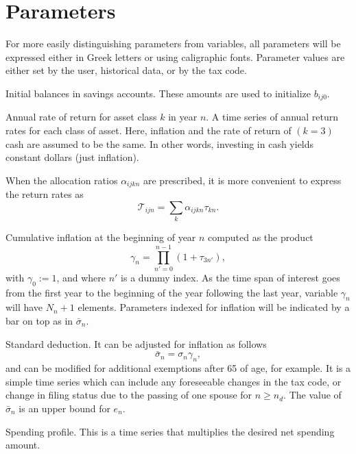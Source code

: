 \documentclass{report}[fleqn,12pt]
\begin{document}
\section{Parameters}
For more easily distinguishing parameters from variables, all parameters will be expressed either in Greek letters
or using caligraphic fonts.
Parameter values are either set by the user, historical data, or by the tax code.
\begin{description}[leftmargin=4em,style=multiline]
\item [$\beta{ij}$]
	Initial balances in savings accounts. These amounts are used to initialize $b_{ij0}$.
\item [$\tau_{kn}$]
	Annual rate of return for asset class $k$ in year $n$.
	A time series of annual return rates for each class of asset.
	Here, inflation and the rate of return of $(k=3)$ cash are assumed to be the same.
	In other words, investing in cash yields constant dollars (just inflation).
\item[$\mathcal{T}_{ijn}$]
	When the allocation ratios $\alpha_{ijkn}$ are prescribed,
	it is more convenient to express the return rates as
	\begin{equation}
		\mathcal{T}_{ijn} = \sum_k \alpha_{ijkn} \tau_{kn}.
	\end{equation}
\item [$\gamma_n$]
	Cumulative inflation at the beginning of year $n$ computed as the product
	\begin{equation}
		\gamma_n = \prod_{n' = 0}^{n-1} (1 + \tau_{3n'}),
	\end{equation}
	with $\gamma_0 := 1$, and where $n'$ is a dummy index.
	As the time span of interest goes from the first year to the beginning
        of the year following the last year,
        variable $\gamma_n$ will have $N_n + 1$ elements.
	Parameters indexed for inflation will be indicated by a bar on top as in $\bar{\sigma}_n$.
\item [$\sigma_n$]
	Standard deduction. It can be adjusted for inflation as follows
	\begin{equation}
		\bar\sigma_n = \sigma_n \gamma_n,
	\end{equation}
	and can be modified for additional exemptions after 65 of age, for example.
	It is a simple time series
	which can include any foreseeable changes in the tax code, or change in filing status due to the
	passing of one spouse for $n\ge n_d$.  The value of $\bar{\sigma}_n$ is an upper bound for $e_n$.
\item [$\xi_{n}$]
	Spending profile. This is a time series that multiplies the desired net spending amount.

\end{description}
\end{document}

